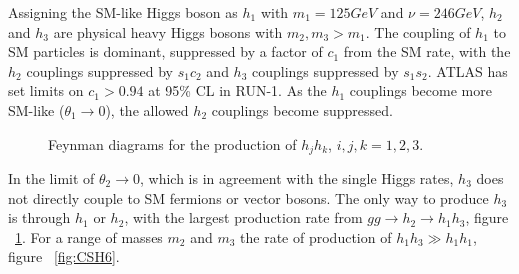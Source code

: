 Assigning the SM-like Higgs boson as ${h_{1}}$ with ${m_{1} = 125 GeV}$  and ${\nu = 246 GeV}$,  ${h_{2}}$ and ${h_{3}}$ are physical heavy Higgs bosons with ${m_{2}, m_{3} > m_{1}}$. The coupling of ${h_{1}}$ to SM particles is dominant, suppressed by a factor of ${c_{1}}$ from the SM rate, with the ${h_{2}}$ couplings suppressed by ${s_{1}c_{2}}$ and ${h_{3}}$ couplings suppressed by ${s_{1}s_{2}}$. ATLAS has set limits on ${c_{1} > 0.94}$ at 95\% CL in RUN-1. As the ${h_{1}}$ couplings become more SM-like (${\theta_{1}\rightarrow{0}}$), the allowed ${h_{2}}$ couplings become suppressed.\newline

\begin{figure}[h]
\begin{center}
\hspace{1cm}
\caption[BSM di-Higgs production diagrams]{Feynman diagrams for the production of ${h_{j}h_{k}}$, ${i, j, k = 1, 2, 3}$.}
\label{fig:FeyComp}
\end{center}
\end{figure}


\indent In the limit of ${\theta_{2}\rightarrow{0}}$, which is in agreement with the single Higgs rates, ${h_{3}}$ does not directly couple to SM fermions or vector bosons. The only way to produce ${h_{3}}$ is through ${h_{1}}$ or ${h_{2}}$, with the largest production rate from ${gg\rightarrow h_{2}\rightarrow h_{1}h_{3}}$, figure ~\ref{fig:FeyComp}. For a range of masses ${m_{2}}$ and ${m_{3}}$ the rate of production of ${h_{1}h_{3} \gg h_{1}h_{1}}$, figure ~\ref{fig:CSH6}. \newline


